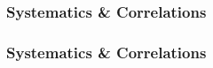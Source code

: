 \begin{frame}
		\frametitle{Systematics \& Correlations}
		\vspace{20pt}
		{\small
		
		}
	\end{frame}
	
	\begin{frame}
		\frametitle{Systematics \& Correlations}
		\vspace{20pt}
		{\small
		
		}
	\end{frame}